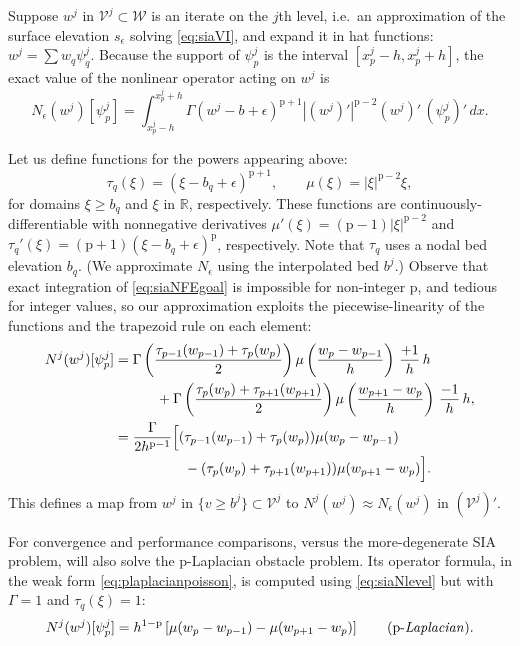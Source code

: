 \documentclass[letterpaper,final,12pt,reqno]{amsart}
\theoremstyle{claim}
\newcommand{\eps}{\epsilon}
\newcommand{\RR}{\mathbb{R}}
\newcommand{\pp}{{\text{p}}}
\numberwithin{equation}{section}
\numberwithin{figure}{section}
\numberwithin{table}{section}
\numberwithin{theorem}{section}
\begin{document}
Suppose $w^j$ in $\mathcal{V}^j \subset \mathcal{W}$ is an iterate on the $j$th level, i.e.~an approximation of the surface elevation $s_\eps$ solving \eqref{eq:siaVI}, and expand it in hat functions: $w^j = \sum w_q \psi_q^j$.  Because the support of $\psi_p^j$ is the interval $[x_p^j-h,x_p^j+h]$, the exact value of the nonlinear operator acting on $w^j$ is
\begin{equation}
N_\eps(w^j)[\psi_p^j] = \int_{x_p^j-h}^{x_p^j+h} \Gamma (w^j-b+\eps)^{\pp+1} \left|(w^j)'\right|^{\pp-2} (w^j)'\, (\psi_p^j)'\,dx.  \label{eq:siaNFEgoal}
\end{equation}

Let us define functions for the powers appearing above:
\begin{equation}
\tau_q(\xi)  = (\xi - b_q + \eps)^{\pp+1}, \qquad \mu(\xi) = |\xi|^{\pp-2} \xi, \label{eq:siahelperfcns}
\end{equation}
for domains $\xi \ge b_q$ and $\xi$ in $\RR$, respectively.  These functions are continuously-differentiable with nonnegative derivatives $\mu'(\xi) = (\pp-1) |\xi|^{\pp-2}$ and $\tau_q'(\xi) = (\pp+1) (\xi-b_q + \eps)^{\pp}$, respectively.  Note that $\tau_q$ uses a nodal bed elevation $b_q$.  (We approximate $N_\eps$ using the interpolated bed $b^j$.)  Observe that exact integration of \eqref{eq:siaNFEgoal} is impossible for non-integer $\pp$, and tedious for integer values, so our approximation exploits the piecewise-linearity of the functions and the trapezoid rule on each element:
\begin{align}
N^j(w^j)[\psi_p^j] &= \Gamma \left(\frac{\tau_{p-1}(w_{p-1}) + \tau_p(w_p)}{2}\right) \mu\left(\frac{w_p-w_{p-1}}{h}\right)\, \frac{+1}{h}\, h \notag \\
    &\qquad\quad  + \Gamma \left(\frac{\tau_p(w_p) + \tau_{p+1}(w_{p+1})}{2}\right) \mu\left(\frac{w_{p+1}-w_p}{h}\right)\, \frac{-1}{h}\, h, \notag \\
    &= \frac{\Gamma}{2h^{\pp-1}} \Big[(\tau_{p-1}(w_{p-1}) + \tau_p(w_p)) \mu(w_p-w_{p-1})  \label{eq:siaNlevel} \\
    &\qquad\qquad\quad - (\tau_p(w_p) + \tau_{p+1}(w_{p+1})) \mu(w_{p+1}-w_p)\Big]. \notag
\end{align}
This defines a map from $w^j$ in $\{v \ge b^j\} \subset \mathcal{V}^j$ to $N^j(w^j) \approx N_\eps(w^j)$ in $(\mathcal{V}^j)'$.

For convergence and performance comparisons, versus the more-degenerate SIA problem, will also solve the $\pp$-Laplacian obstacle problem.  Its operator formula, in the weak form \eqref{eq:plaplacianpoisson}, is computed using \eqref{eq:siaNlevel} but with $\Gamma = 1$ and $\tau_q(\xi)=1$:
\begin{equation}
N^j(w^j)[\psi_p^j] = h^{1-\pp} \left[\mu(w_p-w_{p-1}) - \mu(w_{p+1}-w_p)\right] \qquad \text{($\pp$-\emph{Laplacian}).}  \label{eq:plapNlevel}
\end{equation}
\end{document}
